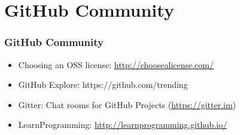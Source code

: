 \section[GitHub Community]{GitHub Community}
\begin{frame}
    \frametitle{GitHub Community}
    
    \begin{itemize}
    \item Choosing an OSS license: \url{http://choosealicense.com/} \pause
    
    \item GitHub Explore: https://github.com/trending \pause
    
    \item Gitter: Chat rooms for GitHub Projects (\url{https://gitter.im})
    
    \item LearnProgramming: \url{http://learnprogramming.github.io/}   
    
    \end{itemize}
\end{frame}

